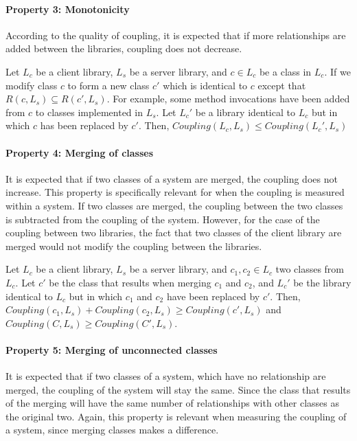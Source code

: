 \paragraph{Property 3: Monotonicity}
According to the quality of coupling, it is expected that if more relationships are added between the libraries, coupling does not decrease.

Let $L_c$ be a client library, $L_s$ be a server library, and $c \in L_c$ be a class in $L_c$. If we modify class $c$ to form a new class $c'$ which is identical to $c$ except that $R(c, L_s) \subseteq R(c', L_s)$. For example, some method invocations have been added from $c$ to classes implemented in $L_s$. Let $L_c'$ be a library identical to $L_c$ but in which $c$ has been replaced by $c'$. Then, $Coupling(L_c, L_s) \le Coupling(L_c', L_s)$

\paragraph{Property 4: Merging of classes}
It is expected that if two classes of a system are merged, the coupling does not increase. This property is specifically relevant for when the coupling is measured within a system. If two classes are merged, the coupling between the two classes is subtracted from the coupling of the system. However, for the case of the coupling between two libraries, the fact that two classes of the client library are merged would not modify the coupling between the libraries.

Let $L_c$ be a client library, $L_s$ be a server library, and $c_1, c_2 \in L_c$ two classes from $L_c$. Let $c'$ be the class that results when merging  $c_1$ and $c_2$, and $L_c'$ be the library identical to $L_c$ but in which $c_1$ and $c_2$ have been replaced by $c'$. Then, $Coupling(c_1, L_s) + Coupling(c_2, L_s) \ge Coupling(c', L_s)$ and $Coupling(C, L_s) \ge Coupling(C', L_s)$.

\paragraph{Property 5: Merging of unconnected classes}
It is expected that if two classes of a system, which have no relationship are merged, the coupling of the system will stay the same. Since the class that results of the merging will have the same number of relationships with other classes as the original two. Again, this property is relevant when measuring the coupling of a system, since merging classes makes a difference.

